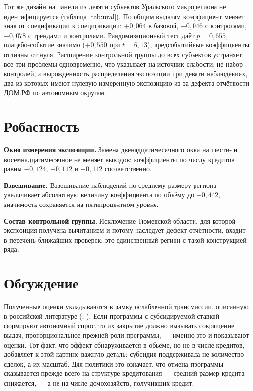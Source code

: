 \documentclass[
  russian,
  11pt,
]{article}
\begin{document}
Тот же дизайн на панели из девяти субъектов Уральского макрорегиона не
идентифицируется (таблица \ref{tab:ural}). По общим выдачам коэффициент
меняет знак от спецификации к спецификации: \(+0{,}064\) в базовой,
\(-0{,}046\) с контролями, \(-0{,}078\) с трендами и контролями.
Рандомизационный тест даёт \(p = 0{,}655\), плацебо-событие значимо
(\(+0{,}550\) при \(t = 6{,}13\)), предсобытийные коэффициенты отличны
от нуля. Расширение контрольной группы до всех субъектов устраняет все
три проблемы одновременно, что указывает на источник слабости: не набор
контролей, а вырожденность распределения экспозиции при девяти
наблюдениях, два из которых имеют нулевую измеренную экспозицию из-за
дефекта отчётности ДОМ.РФ по автономным округам.

\section{Робастность}\label{ux440ux43eux431ux430ux441ux442ux43dux43eux441ux442ux44c}

\textbf{Окно измерения экспозиции.} Замена двенадцатимесячного окна на
шести- и восемнадцатимесячное не меняет выводов: коэффициенты по числу
кредитов равны \(-0{,}124\), \(-0{,}112\) и \(-0{,}112\) соответственно.

\textbf{Взвешивание.} Взвешивание наблюдений по среднему размеру региона
увеличивает абсолютную величину коэффициента по объёму до \(-0{,}442\),
значимость сохраняется на пятипроцентном уровне.

\textbf{Состав контрольной группы.} Исключение Тюменской области, для
которой экспозиция получена вычитанием и потому наследует дефект
отчётности, входит в перечень ближайших проверок; это единственный
регион с такой конструкцией ряда.

\section{Обсуждение}\label{ux43eux431ux441ux443ux436ux434ux435ux43dux438ux435}

Полученные оценки укладываются в рамку ослабленной трансмиссии,
описанную в российской литературе (; ). Если программы с субсидируемой ставкой формируют
автономный спрос, то их закрытие должно вызывать сокращение выдач,
пропорциональное прежней роли программы, --- именно это и показывают
оценки. Тот факт, что эффект обнаруживается в объёме, но не в числе
кредитов, добавляет к этой картине важную деталь: субсидия поддерживала
не количество сделок, а их масштаб. Для политики это означает, что
отмена программы сказывается прежде всего на структуре кредитования ---
средний размер кредита снижается, --- а не на числе домохозяйств,
получивших кредит.
\end{document}
